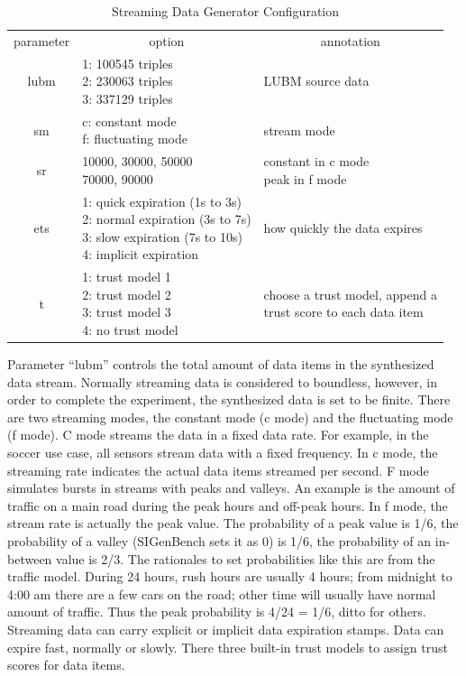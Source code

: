 \begin{table}[!htbp]
	\centering
    \caption{Streaming Data Generator Configuration}
    \label{tab:6-sdgc}
    \begin{tabular}{|c||l|l|} \hline
    parameter & \multicolumn{1}{c|}{option} & \multicolumn{1}{c|}{annotation} \\ \hhline{|=#=|=|}
    lubm & \makecell[l]{1: 100545 triples \\ 2: 230063 triples \\ 3: 337129 triples} & LUBM source data \\ \hline
    sm & \makecell[l]{c: constant mode \\ f: fluctuating mode} & stream mode \\ \hline
    sr & \makecell[l]{10000, 30000, 50000 \\ 70000, 90000} & \makecell[l]{constant in c mode \\ peak in f mode} \\ \hline
    ets & \makecell[l]{1: quick expiration (1s to 3s) \\ 2: normal expiration (3s to 7s) \\ 3: slow expiration (7s to 10s) \\ 4: implicit expiration} & how quickly the data expires \\ \hline
    t & \makecell[l]{1: trust model 1 \\ 2: trust model 2 \\ 3: trust model 3 \\ 4: no trust model} & \makecell[l]{choose a trust model, append a \\trust score to each data item} \\ \hline
    \end{tabular}
\end{table}

Parameter ``lubm'' controls the total amount of data items in the synthesized data stream. 
Normally streaming data is considered to boundless, however, in order to complete the experiment, the synthesized data is set to be finite. 
There are two streaming modes, the constant mode (c mode) and the fluctuating mode (f mode).
C mode streams the data in a fixed data rate.
For example, in the soccer use case, all sensors stream data with a fixed frequency.
In c mode, the streaming rate indicates the actual data items streamed per second. 
F mode simulates bursts in streams with peaks and valleys. 
An example is the amount of traffic on a main road during the peak hours and off-peak hours. 
In f mode, the stream rate is actually the peak value. 
The probability of a peak value is 1/6, the probability of a valley (SIGenBench sets it as 0) is 1/6, the probability of an in-between value is 2/3. 
The rationales to set probabilities like this are from the traffic model. 
During 24 hours, rush hours are usually 4 hours; from midnight to 4:00 am there are a few cars on the road; other time will usually have normal amount of traffic. 
Thus the peak probability is 4/24 = 1/6, ditto for others.
Streaming data can carry explicit or implicit data expiration stamps.
Data can expire fast, normally or slowly.
There three built-in trust models to assign trust scores for data items.

